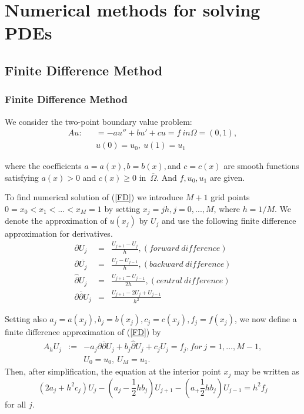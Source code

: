 \documentclass{beamer}
\begin{document}
\section{Numerical methods for solving PDEs}
\subsection{Finite Difference Method}
\begin{frame}
\frametitle{Finite Difference Method}
We consider the two-point boundary value problem:
\begin{eqnarray}
Au:&&=-au''+bu'+cu=f \ in \Omega=(0,1),\\
\label{FD}
&&u(0)=u_0,\ u(1)=u_1
\end{eqnarray}

where the coefficients $a=a(x),b=b(x),$and $c=c(x)$ are smooth functions satisfying $a(x)>0$ and $c(x)\geq0$ in\ $\overline{\Omega}$. And $f, u_0, u_1$ are given.
\end{frame}

\begin{frame}
To find numerical solution of (\ref{FD}) we introduce $M+1$ grid points $0=x_0<x_1<...<x_M=1$ by setting $x_j=jh, j=0,...,M$, where $h=1/M$. We denote the approximation of $u(x_j)$ by $U_j$ and use the following finite difference approximation for derivatives.
\begin{eqnarray*}
\partial U_j &=& \frac{U_{j+1}-U_j}{h}, (forward\ difference)\\
\partial \overline{U_j} &=& \frac{U_{j}-U_{j-1}}{h}, (backward\ difference)\\
\widehat{\partial} U_j &=& \frac{U_{j+1}-U_{j-1}}{2h}, (central\ difference)\\
\partial\overline{\partial} U_j &=& \frac{U_{j+1}-2U_j+U_{j-1}}{h^2}
\end{eqnarray*}
\end{frame}

\begin{frame}
Setting also $a_j=a(x_j), b_j=b(x_j), c_j=c(x_j), f_j=f(x_j)$, we now define a finite difference approximation of (\ref{FD}) by
\begin{eqnarray}
A_hU_j&:=& -a_j\partial\overline{\partial} U_j + b_j\widehat{\partial} U_j + c_jU_j=f_j, for\ j= 1, \ldots, M-1,\\
\label{FDSystem}
&&U_0 =u_0,\ U_M = u_1.
\end{eqnarray}
Then, after simplification, the equation at the interior point $x_j$ may be written as
\begin{equation}
(2a_j+h^2c_j)U_j-(a_j-\frac{1}{2}hb_j)U_{j+1}-(a_+\frac{1}{2}hb_j)U_{j-1}=h^2f_j
\label{FDu}
\end{equation}
for all $j$.
\end{frame}
\end{document}
